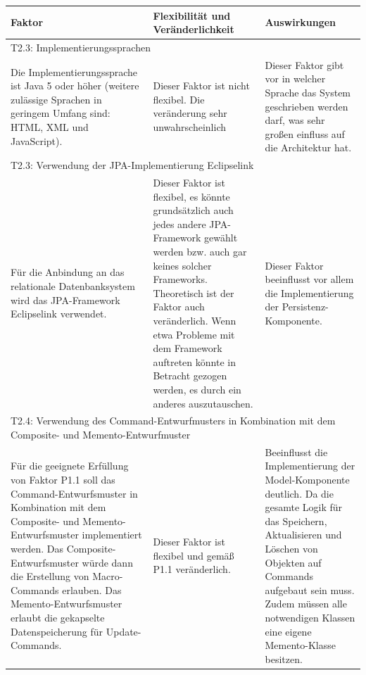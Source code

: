 \documentclass[fontsize=12pt,paper=a4,twoside]{scrartcl}
\begin{document}
\begin{tabularx}{\textwidth}{|X|X|X|}
\hline
\textbf{Faktor} & \textbf{Flexibilität und Veränderlichkeit} & \textbf{Auswirkungen}\\\hline
\hline
\multicolumn{3}{|l|}{T2.3: Implementierungssprachen}\\\hline
Die Implementierungssprache ist Java 5 oder höher (weitere zulässige Sprachen in geringem Umfang sind: HTML, XML und JavaScript). & Dieser Faktor ist nicht flexibel. Die veränderung sehr unwahrscheinlich & Dieser Faktor gibt vor in welcher Sprache das System geschrieben werden darf, was sehr großen einfluss auf die Architektur hat. \\\hline

\multicolumn{3}{|l|}{T2.3: Verwendung der JPA-Implementierung Eclipselink}\\\hline
Für die Anbindung an das relationale Datenbanksystem wird das JPA-Framework Eclipselink verwendet. & Dieser Faktor ist flexibel, es könnte grundsätzlich auch jedes andere JPA-Framework gewählt werden bzw. auch gar keines solcher Frameworks. Theoretisch ist der Faktor auch veränderlich. Wenn etwa Probleme mit dem Framework auftreten könnte in Betracht gezogen werden, es durch ein anderes auszutauschen. & Dieser Faktor beeinflusst vor allem die Implementierung der Persistenz-Komponente. \\\hline
\multicolumn{3}{|p{\dimexpr\textwidth-2\tabcolsep\relax}|}{T2.4: Verwendung des Command-Entwurfmusters in Kombination mit dem Composite- und Memento-Entwurfmuster}\\\hline
Für die geeignete Erfüllung von Faktor P1.1 soll das Command-Entwurfsmuster in Kombination mit dem Composite- und Memento-Entwurfsmuster implementiert werden. Das Composite-Entwurfsmuster würde dann die Erstellung von Macro-Commands erlauben. Das Memento-Entwurfsmuster erlaubt die gekapselte Datenspeicherung für Update-Commands. & Dieser Faktor ist flexibel und gemäß P1.1 veränderlich. & Beeinflusst die Implementierung der Model-Komponente deutlich. Da die gesamte Logik für das Speichern, Aktualisieren und Löschen von Objekten auf Commands aufgebaut sein muss. Zudem müssen alle notwendigen Klassen eine eigene Memento-Klasse besitzen. \\\hline
\end{tabularx}
\end{document}
